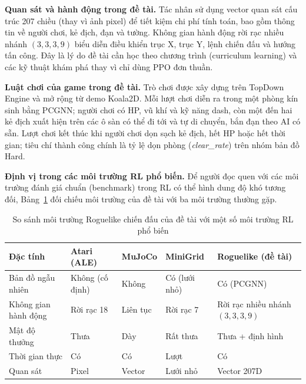 \textbf{Quan sát và hành động trong đề tài.} Tác nhân sử dụng vector quan sát cấu trúc 207 chiều (thay vì ảnh pixel) để tiết kiệm chi phí tính toán, bao gồm thông tin về người chơi, kẻ địch, đạn và tường. Không gian hành động rời rạc nhiều nhánh $(3,3,3,9)$ biểu diễn điều khiển trục X, trục Y, lệnh chiến đấu và hướng tấn công. Đây là lý do đề tài cần học theo chương trình (curriculum learning) và các kỹ thuật khám phá thay vì chỉ dùng PPO đơn thuần.

\textbf{Luật chơi của game trong đề tài.} Trò chơi được xây dựng trên TopDown Engine và mở rộng từ demo Koala2D. Mỗi lượt chơi diễn ra trong một phòng kín sinh bằng PCGNN; người chơi có HP, vũ khí và kỹ năng dash, còn một đến hai kẻ địch xuất hiện trên các ô sàn có thể đi tới và tự di chuyển, bắn đạn theo AI có sẵn. Lượt chơi kết thúc khi người chơi dọn sạch kẻ địch, hết HP hoặc hết thời gian; tiêu chí thành công chính là tỷ lệ dọn phòng (\emph{clear\_rate}) trên nhóm bản đồ Hard.

\textbf{Định vị trong các môi trường RL phổ biến.} Để người đọc quen với các môi trường đánh giá chuẩn (benchmark) trong RL có thể hình dung độ khó tương đối, Bảng~\ref{tab:rl_env_comparison} đối chiếu môi trường của đề tài với ba môi trường thường gặp.

\begin{table}[H]
    \centering
    \small
    \caption{So sánh môi trường Roguelike chiến đấu của đề tài với một số môi trường RL phổ biến}
    \label{tab:rl_env_comparison}
    \begin{tabular}{|p{3.2cm}|p{2.6cm}|p{2.6cm}|p{2.4cm}|p{2.8cm}|}
        \hline
        \textbf{Đặc tính} & \textbf{Atari (ALE)} & \textbf{MuJoCo} & \textbf{MiniGrid} & \textbf{Roguelike (đề tài)} \\
        \hline
        Bản đồ ngẫu nhiên & Không (cố định) & Không & Có (lưới nhỏ) & Có (PCGNN) \\
        \hline
        Không gian hành động & Rời rạc 18 & Liên tục & Rời rạc 7 & Rời rạc nhiều nhánh $(3,3,3,9)$ \\
        \hline
        Mật độ thưởng & Thưa & Dày & Rất thưa & Thưa + định hình \\
        \hline
        Thời gian thực & Có & Có & Lượt & Có \\
        \hline
        Quan sát & Pixel & Vector & Lưới nhỏ & Vector 207D \\
        \hline
    \end{tabular}
\end{table}


